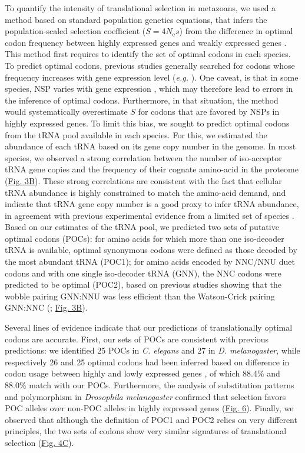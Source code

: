 To quantify the intensity of translational selection in metazoans, we used a method based on standard population genetics equations, that infers the population-scaled selection coefficient ($S=4\textit{N}_{\text{e}}s$) from the difference in optimal codon frequency between highly expressed genes and weakly expressed genes \citep{sharp_variation_2005, dos_reis_estimating_2009}. This method first requires to identify the set of optimal codons in each species. To predict optimal codons, previous studies generally searched for codons whose frequency increases with gene expression level (\textit{e.g.} \citet{duret_expression_1999, dos_reis_estimating_2009}). One caveat, is that in some species, NSP varies with gene expression \citep{pouyet_recombination_2017}, which may therefore lead to errors in the inference of optimal codons. Furthermore, in that situation, the method would systematically overestimate $S$ for codons that are favored by NSPs in highly expressed genes. To limit this bias, we sought to predict optimal codons from the tRNA pool available in each species. For this, we estimated the abundance of each tRNA based on its gene copy number in the genome. In most species, we observed a strong correlation between the number of iso-acceptor tRNA gene copies and the frequency of their cognate amino-acid in the proteome (\hyperref[fig:CU3]{Fig. 3B}). These strong correlations are consistent with the fact that cellular tRNA abundance is highly constrained to match the amino-acid demand, and indicate that tRNA gene copy number is a good proxy to infer tRNA abundance, in agreement with previous experimental evidence from a limited set of species \citep{behrens_high-resolution_2021}.
Based on our estimates of the tRNA pool, we predicted two sets of putative optimal codons (POCs): for amino acids for which more than one iso-decoder tRNA is available, optimal synonymous codons were defined as those decoded by the most abundant tRNA (POC1); for amino acids encoded by NNC/NNU duet codons and with one single iso-decoder tRNA (GNN), the NNC codons were predicted to be optimal (POC2), based on previous studies showing that the wobble pairing GNN:NNU was less efficient than the Watson-Crick pairing GNN:NNC (\citet{stadler_wobble_2011, chan_frequent_2017}; \hyperref[fig:CU3]{Fig. 3B}).

Several lines of evidence indicate that our predictions of translationally optimal codons are accurate. First, our sets of POCs are consistent with previous predictions: we identified 25 POCs in \textit{C. elegans} and 27 in \textit{D. melanogaster}, while respectively 26 and 25 optimal codons had been inferred based on difference in codon usage between highly and lowly expressed genes \citep{duret_expression_1999}, of which 88.4\% and 88.0\% match with our POCs. Furthermore, the analysis of substitution patterns and polymorphism in \textit{Drosophila melanogaster} confirmed that selection favors POC alleles over non-POC alleles in highly expressed genes (\hyperref[fig:CU6]{Fig. 6}). Finally, we observed that although the definition of POC1 and POC2 relies on very different principles, the two sets of codons show very similar signatures of translational selection (\hyperref[fig:CU4]{Fig. 4C}). 


